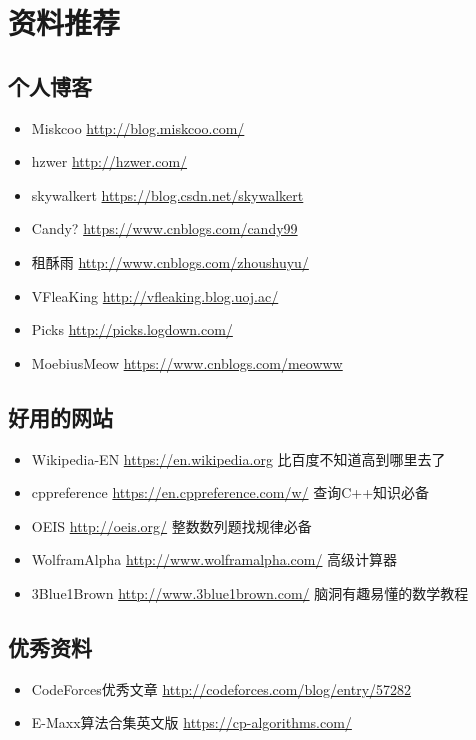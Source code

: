 \chapter{资料推荐}
\section{个人博客}
\begin{itemize}
	\item Miskcoo \url{http://blog.miskcoo.com/}
	\item hzwer \url{http://hzwer.com/}
    \item skywalkert \url{https://blog.csdn.net/skywalkert}
    \item Candy? \url{https://www.cnblogs.com/candy99}
    \item 租酥雨 \url{http://www.cnblogs.com/zhoushuyu/}
    \item VFleaKing \url{http://vfleaking.blog.uoj.ac/}
    \item Picks \url{http://picks.logdown.com/}
    \item MoebiusMeow \url{https://www.cnblogs.com/meowww}
\end{itemize}
\section{好用的网站}
\begin{itemize}
    \item Wikipedia-EN \url{https://en.wikipedia.org} 比百度不知道高到哪里去了
    \item cppreference \url{https://en.cppreference.com/w/} 查询C++知识必备
    \item OEIS \url{http://oeis.org/} 整数数列题找规律必备
    \item WolframAlpha \url{http://www.wolframalpha.com/} 高级计算器
    \item 3Blue1Brown \url{http://www.3blue1brown.com/} 脑洞有趣易懂的数学教程
\end{itemize}
\section{优秀资料}
\begin{itemize}
    \item CodeForces优秀文章 \url{http://codeforces.com/blog/entry/57282}
    \item E-Maxx算法合集英文版 \url{https://cp-algorithms.com/}
\end{itemize}

